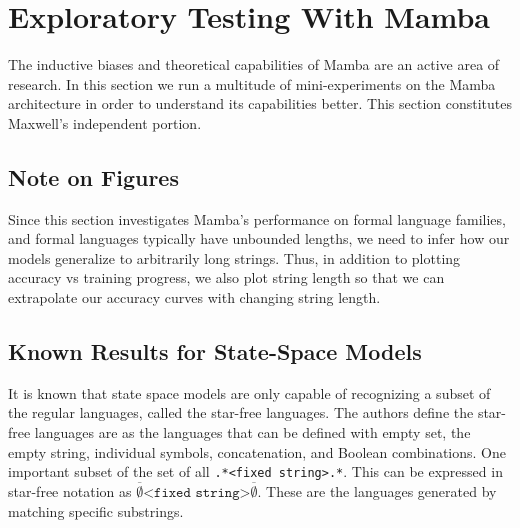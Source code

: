 \section{Exploratory Testing With Mamba}
The inductive biases and theoretical capabilities of Mamba are an active area of
research. In this section we run a multitude of mini-experiments on the Mamba
architecture in order to understand its capabilities better.
This section constitutes Maxwell's independent portion.

\subsection{Note on Figures}
Since this section investigates Mamba's performance on formal language families,
and formal languages typically have unbounded lengths, we need to infer how our
models generalize to arbitrarily long strings. Thus, in addition to plotting
accuracy vs training progress, we also plot string length so that we can
extrapolate our accuracy curves with changing string length.

\subsection{Known Results for State-Space Models}
It is known that state space models are only capable of recognizing a subset of
the regular languages\cite{ssmformal}, called the star-free languages.
The authors define the star-free languages are as the languages that can be
defined with empty set, the empty string, individual symbols, concatenation, and
Boolean combinations.
One important subset of the set of all \verb-.*<fixed string>.*-.
This can be expressed in star-free notation as
$\overline{\emptyset}\texttt{<fixed string>}\overline{\emptyset}$.
These are the languages generated by matching specific substrings.

